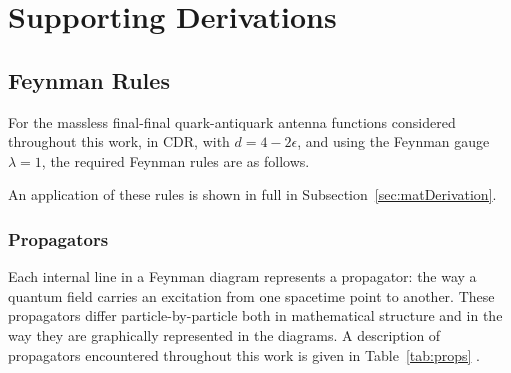 \chapter{Supporting Derivations}\label{ap:supportingDerivations}

\section{Feynman Rules}\label{sec:FeynmanRules}

For the massless final-final quark-antiquark antenna functions considered throughout this 
work, in CDR, with $d=4-2\epsilon$, and using the Feynman gauge $\lambda=1$, the required Feynman rules are as follows.

An application of these rules is shown in full in Subsection~\ref{sec:matDerivation}.

\subsection{Propagators}

Each internal line in a Feynman diagram represents a propagator: the way a quantum 
field carries an excitation from one spacetime point to another. These propagators 
differ particle-by-particle both in mathematical structure and in the way they are 
graphically represented in the diagrams. A description of propagators encountered 
throughout this work is given in Table~\ref{tab:props} \cite{Ellis:1996mzs,Peskin:1995ev}.

